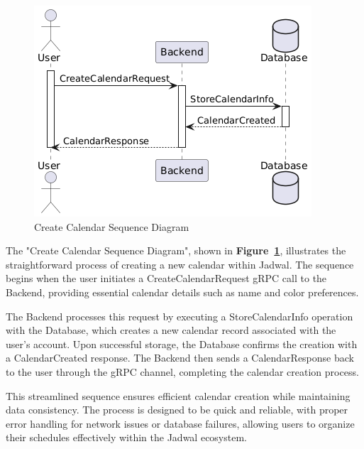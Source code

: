 \begin{figure}[!h]
  \centering
  \includegraphics[width=\textwidth]{images/docs/diagrams/sequence-diagrams/all-sequence-diagrams/Create Calendar.png}
  \caption{Create Calendar Sequence Diagram}
  \label{fig:seq/create-calendar}
\end{figure}

The "Create Calendar Sequence Diagram", shown in \textbf{Figure~\ref{fig:seq/create-calendar}}, illustrates the straightforward process of creating a new calendar within Jadwal. The sequence begins when the user initiates a CreateCalendarRequest gRPC call to the Backend, providing essential calendar details such as name and color preferences.

The Backend processes this request by executing a StoreCalendarInfo operation with the Database, which creates a new calendar record associated with the user's account. Upon successful storage, the Database confirms the creation with a CalendarCreated response. The Backend then sends a CalendarResponse back to the user through the gRPC channel, completing the calendar creation process.

This streamlined sequence ensures efficient calendar creation while maintaining data consistency. The process is designed to be quick and reliable, with proper error handling for network issues or database failures, allowing users to organize their schedules effectively within the Jadwal ecosystem.